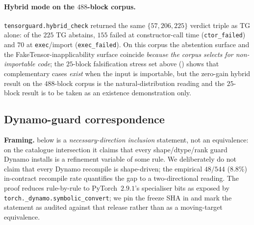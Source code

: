 \paragraph{Hybrid mode on the $488$-block corpus.}
\texttt{tensorguard.hybrid\_check} returned the same
$\{57,206,225\}$ verdict triple as \textsc{TG} alone: of the
$225$ \textsc{TG} abstains, $155$ failed at constructor-call
time (\texttt{ctor\_failed}) and $70$ at \texttt{exec}/import
(\texttt{exec\_failed}). On this corpus the abstention surface
and the FakeTensor-inapplicability surface coincide
\emph{because the corpus selects for non-importable code}; the
$25$-block falsification stress set above
() shows that complementary cases
\emph{exist} when the input is importable, but the zero-gain
hybrid result on the $488$-block corpus is the natural-distribution
reading and the $25$-block result is to be taken as an
existence demonstration only.

\subsection{Dynamo-guard correspondence}
\label{sec:eval-dynamo}

\textbf{Framing.}  below is a
\emph{necessary-direction inclusion} statement, not an equivalence:
on the catalogue intersection it claims that every shape/dtype/rank
guard Dynamo installs is a refinement variable of some
 rule. We deliberately do not claim that every
Dynamo recompile is shape-driven; the empirical $48/544$
($8.8\%$) in-contract recompile rate quantifies the gap to a
two-directional reading. The proof reduces rule-by-rule to
PyTorch~$2.9.1$'s specialiser bits as exposed by
\texttt{torch.\_dynamo.symbolic\_convert}; we pin the freeze SHA in  and mark the statement as audited against
that release rather than as a moving-target equivalence.

